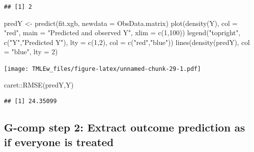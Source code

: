 \documentclass[
]{book}
\newenvironment{Shaded}{\begin{snugshade}}{\end{snugshade}}
\newcommand{\AttributeTok}[1]{\textcolor[rgb]{0.77,0.63,0.00}{#1}}
\newcommand{\DecValTok}[1]{\textcolor[rgb]{0.00,0.00,0.81}{#1}}
\newcommand{\FunctionTok}[1]{\textcolor[rgb]{0.00,0.00,0.00}{#1}}
\newcommand{\NormalTok}[1]{#1}
\newcommand{\OtherTok}[1]{\textcolor[rgb]{0.56,0.35,0.01}{#1}}
\newcommand{\SpecialCharTok}[1]{\textcolor[rgb]{0.00,0.00,0.00}{#1}}
\newcommand{\StringTok}[1]{\textcolor[rgb]{0.31,0.60,0.02}{#1}}
\begin{document}
\begin{verbatim}
## [1] 2
\end{verbatim}

\begin{Shaded}
\begin{Highlighting}[]
\NormalTok{predY }\OtherTok{\textless{}{-}} \FunctionTok{predict}\NormalTok{(fit.xgb, }\AttributeTok{newdata =}\NormalTok{ ObsData.matrix)}
\FunctionTok{plot}\NormalTok{(}\FunctionTok{density}\NormalTok{(Y), }
     \AttributeTok{col =} \StringTok{"red"}\NormalTok{, }
     \AttributeTok{main =} \StringTok{"Predicted and observed Y"}\NormalTok{,}
     \AttributeTok{xlim =} \FunctionTok{c}\NormalTok{(}\DecValTok{1}\NormalTok{,}\DecValTok{100}\NormalTok{))  }
\FunctionTok{legend}\NormalTok{(}\StringTok{"topright"}\NormalTok{, }
       \FunctionTok{c}\NormalTok{(}\StringTok{"Y"}\NormalTok{,}\StringTok{"Predicted Y"}\NormalTok{), }
       \AttributeTok{lty =} \FunctionTok{c}\NormalTok{(}\DecValTok{1}\NormalTok{,}\DecValTok{2}\NormalTok{), }
       \AttributeTok{col =} \FunctionTok{c}\NormalTok{(}\StringTok{"red"}\NormalTok{,}\StringTok{"blue"}\NormalTok{))}
\FunctionTok{lines}\NormalTok{(}\FunctionTok{density}\NormalTok{(predY), }\AttributeTok{col =} \StringTok{"blue"}\NormalTok{, }\AttributeTok{lty =} \DecValTok{2}\NormalTok{)}
\end{Highlighting}
\end{Shaded}

\texttt{[image: TMLEw\_files/figure-latex/unnamed-chunk-29-1.pdf]}

\begin{Shaded}
\begin{Highlighting}[]
\NormalTok{caret}\SpecialCharTok{::}\FunctionTok{RMSE}\NormalTok{(predY,Y)}
\end{Highlighting}
\end{Shaded}

\begin{verbatim}
## [1] 24.35099
\end{verbatim}

\hypertarget{g-comp-step-2-extract-outcome-prediction-as-if-everyone-is-treated}{%
\subsection{G-comp step 2: Extract outcome prediction as if everyone is treated}\label{g-comp-step-2-extract-outcome-prediction-as-if-everyone-is-treated}}

\begin{Shaded}
\end{Shaded}
\end{document}
